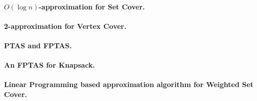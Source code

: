 \documentclass[11pt,a4paper]{article}
\theoremstyle{definition}
\begin{document}
\paragraph{$O(\log n)$-approximation for Set Cover.}

\paragraph{2-approximation for Vertex Cover.}

\paragraph{PTAS and FPTAS.}

\paragraph{An FPTAS for Knapsack.}

\paragraph{Linear Programming based approximation algorithm for Weighted Set Cover.}
\end{document}
